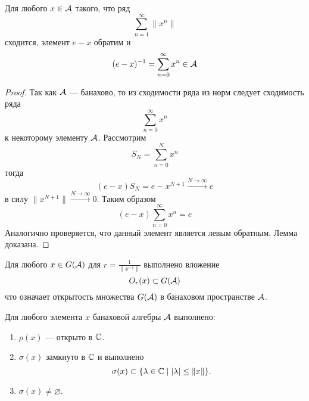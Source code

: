 \begin{lemma}
	Для любого $x \in \mathcal{A}$ такого, что ряд 
	$$
	\sum_{n=1}^\infty \|x^n\| 
	$$
	сходится, элемент $e - x$ обратим и 
	$$
	(e - x)^{-1} = \sum_{n=0}^{\infty} x^n \in \mathcal{A}
	$$
\end{lemma}
\begin{proof}
	Так как $\mathcal{A}$ --- банахово, то из сходимости ряда из норм следует сходимость ряда 
	$$
	\sum_{n=0}^\infty x^n
	$$
	к некоторому элементу $\mathcal{A}$. Рассмотрим
	$$
	S_N = \sum_{n=0}^N x^n
	$$
	тогда 
	$$
	(e - x) S_N = e - x^{N+1} \xrightarrow{N \to \infty} e 
	$$
	в силу $\|x^{N+1}\| \xrightarrow{N \to \infty} 0$. Таким образом 
	$$
	(e - x) \sum_{n=0}^{\infty} x^n  = e
	$$
	Аналогично проверяется, что данный элемент является левым обратным. Лемма доказана. 
\end{proof}
\begin{next0}
	Для любого $x \in G(\mathcal{A})$ для $r = \frac{1}{\|x^{-1}\|}$ выполнено вложение
	$$
	O_r(x) \subset G(\mathcal{A})
	$$
	что означает открытость множества $G(\mathcal{A})$ в банаховом пространстве $\mathcal{A}$.
\end{next0}
\begin{theorem}\label{th:spectrumprops}
	Для любого элемента $x$ банаховой алгебры $\mathcal{A}$ выполнено: 
	\begin{enumerate}
		\item $\rho(x)$ --- открыто в $\mathbb{C}$.
		\item $\sigma(x)$ замкнуто в $\mathbb{C}$ и выполнено 
		$$
		\sigma(x) \subset \{\lambda \in \mathbb{C} \mid |\lambda| \leq \|x\|\}.
		$$
		\item $\sigma(x) \neq \varnothing$.	
	\end{enumerate}
\end{theorem}
